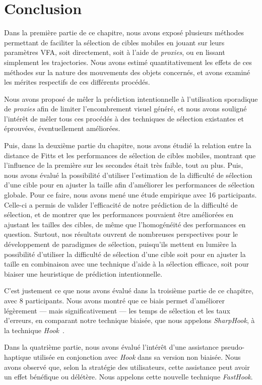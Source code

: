 	\section{Conclusion}
	Dans la première partie de ce chapitre, nous avons exposé plusieurs méthodes permettant de faciliter la sélection de cibles mobiles en jouant sur leurs paramètres VFA, soit directement, soit à l'aide de \emph{proxies}, ou en lissant simplement les trajectories. Nous avons estimé quantitativement les effets de ces méthodes sur la nature des mouvements des objets concernés, et avons examiné les mérites respectifs de ces différents procédés.
	
	Nous avons proposé de mêler la prédiction intentionnelle à l'utilisation sporadique de \emph{proxies} afin de limiter l'encombrement visuel généré, et nous avons souligné l'intérêt de mêler tous ces procédés à des techniques de sélection existantes et éprouvées, éventuellement améliorées.
	
	Puis, dans la deuxième partie du chapitre, nous avons étudié la relation entre la distance de Fitts et les performances de sélection de cibles mobiles, montrant que l'influence de la première sur les secondes était très faible, tout au plus. Puis, nous avons évalué la possibilité d'utiliser l'estimation de la difficulté de sélection d'une cible pour en ajuster la taille afin d'améliorer les performances de sélection globale. Pour ce faire, nous avons mené une étude empirique avec 16 participants. Celle-ci a permis de valider l'efficacité de notre prédiction de la difficulté de sélection, et de montrer que les performances pouvaient être améliorées en ajustant les tailles des cibles, de même que l'homogénéité des performances en question. Surtout, nos résultats ouvrent de nombreuses perspectives pour le développement de paradigmes de sélection, puisqu'ils mettent en lumière la possibilité d'utiliser la difficulté de sélection d'une cible soit pour en ajuster la taille en combinaison avec une technique d'aide à la sélection efficace, soit pour biaiser une heuristique de prédiction intentionnelle.
	
	C'est justement ce que nous avons évalué dans la troisième partie de ce chapitre, avec 8 participants. Nous avons montré que ce biais permet d'améliorer légèrement --- mais significativement --- les temps de sélection et les taux d'erreurs, en comparant notre technique biaisée, que nous appelons \emph{SharpHook}, à la technique \emph{Hook}~\cite{ortega2013hook}.
	
	Dans la quatrième partie, nous avons évalué l'intérêt d'une assistance pseudo-haptique utilisée en conjonction avec \emph{Hook} dans sa version non biaisée. Nous avons observé que, selon la stratégie des utilisateurs, cette assistance peut avoir un effet bénéfique ou délétère. Nous appelons cette nouvelle technique \emph{FastHook}.
	
